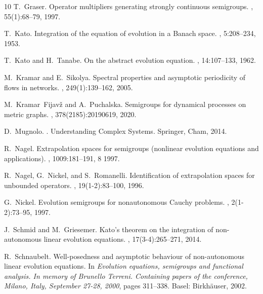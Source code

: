 \documentclass[a4paper,oneside,10pt]{amsart}
\theoremstyle{definition}
\numberwithin{equation}{section}
\begin{document}
\begin{thebibliography}{10}
T.~Graser.
\newblock Operator multipliers generating strongly continuous semigroups.
, 55(1):68--79, 1997.

T.~Kato.
\newblock Integration of the equation of evolution in a {B}anach space.
, 5:208--234, 1953.

T.~Kato and H.~Tanabe.
\newblock On the abstract evolution equation.
, 14:107--133, 1962.

M.~Kramar and E.~Sikolya.
\newblock Spectral properties and asymptotic periodicity of flows in networks.
, 249(1):139--162, 2005.

M.~Kramar~Fijav\v{z} and A.~Puchalska.
\newblock Semigroups for dynamical processes on metric graphs.
, 378(2185):20190619, 2020.

D.~Mugnolo.
.
\newblock Understanding Complex Systems. Springer, Cham, 2014.

R.~Nagel.
\newblock Extrapolation spaces for semigroups (nonlinear evolution equations
  and applications).
, 1009:181--191, 8 1997.

R.~Nagel, G.~Nickel, and S.~Romanelli.
\newblock Identification of extrapolation spaces for unbounded operators.
, 19(1-2):83--100, 1996.

G.~Nickel.
\newblock Evolution semigroups for nonautonomous {C}auchy problems.
, 2(1-2):73--95, 1997.

J.~Schmid and M.~Griesemer.
\newblock Kato's theorem on the integration of non-autonomous linear evolution
  equations.
, 17(3-4):265--271, 2014.

R.~Schnaubelt.
\newblock Well-posedness and asymptotic behaviour of non-autonomous linear
  evolution equations.
\newblock In {\em Evolution equations, semigroups and functional analysis. In
  memory of Brunello Terreni. Containing papers of the conference, Milano,
  Italy, September 27-28, 2000}, pages 311--338. Basel: Birkh{\"a}user, 2002.

\end{thebibliography}
\end{document}
